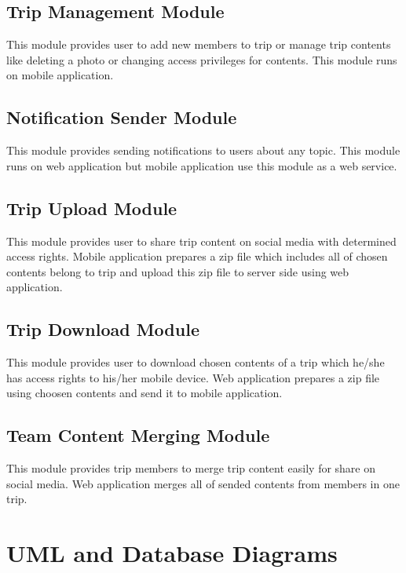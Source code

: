 \subsection{Trip Management Module}
This module provides user to add new members to trip or manage trip contents like deleting a photo or changing access privileges for contents. This module runs on mobile application.
\subsection{Notification Sender Module}   
This module provides sending notifications to users about any topic. This module runs on web application but mobile application use this module as a web service.
\subsection{Trip Upload Module}
This module provides user to share trip content on social media with determined access rights. Mobile application prepares a zip file which includes all of chosen contents belong to trip and upload this zip file to server side using web application.
\subsection{Trip Download Module}
This module provides user to download chosen contents of a trip which he/she has access rights to his/her mobile device. Web application prepares a zip file using choosen contents and send it to mobile application.
\subsection{Team Content Merging Module}
This module provides trip members to merge trip content easily for share on social media. Web application merges all of sended contents from members in one trip.

\newpage 
\section{UML and Database Diagrams}

